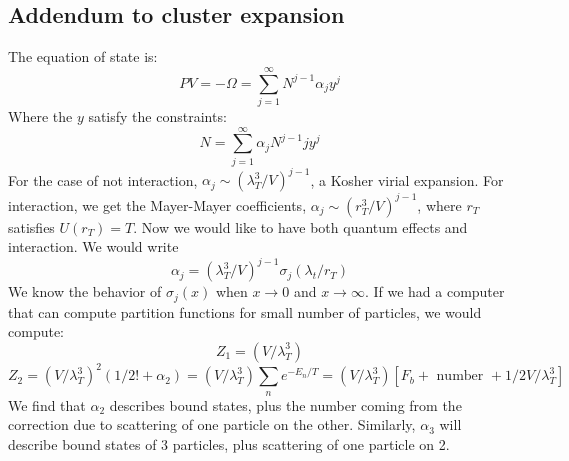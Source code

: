 \documentclass[12 pt]{article}
\begin{document}
\subsection*{Addendum to cluster expansion}
The equation of state is:
\[       PV = - \Omega = \sum_{j=1}^{\infty} N^{j-1} \alpha_j y^j      \]
Where the $y$ satisfy the constraints:
\[     N = \sum_{j=1}^{\infty} \alpha_j N^{j-1} j y^j       \]
For the case of not interaction, $\alpha_j \sim (\lambda_T^3 / V)^{j-1}$, a Kosher virial expansion. For interaction, we get the Mayer-Mayer coefficients, $\alpha_j \sim (r_T^3 /V)^{j-1}$, where $r_T$ satisfies $U(r_T) = T$. Now we would like to have both quantum effects and interaction. We would write
\[       \alpha_j = (\lambda_T^3 / V)^{j-1} \sigma_j (\lambda_t / r_T)    \]
We know the behavior of $\sigma_j(x)$ when $x\to 0 $ and $x \to \infty$. If we had a computer that can compute partition functions for small number of particles, we would compute:
\[   Z_1 =  (V/\lambda_T^3)   \]
\[  Z_2 = (V/\lambda_T^3) ^2 (1/2! + \alpha_2)  = (V/\lambda_T^3) \sum_n e^{- E_n/T} = (V/\lambda_T^3) \left[F_b + \text{ number } + 1/2 V/\lambda^3_T \right] \]
We find that $\alpha_2$ describes bound states, plus the number coming from the correction due to scattering of one particle on the other. Similarly, $\alpha_3$ will describe bound states of 3 particles, plus scattering of one particle on 2.
\end{document}
